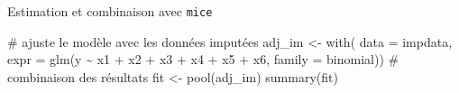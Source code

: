 \documentclass[
  ignorenonframetext,
]{beamer}
\newenvironment{Shaded}{\begin{snugshade}}{\end{snugshade}}
\newcommand{\AttributeTok}[1]{\textcolor[rgb]{0.40,0.45,0.13}{#1}}
\newcommand{\CommentTok}[1]{\textcolor[rgb]{0.37,0.37,0.37}{#1}}
\newcommand{\FunctionTok}[1]{\textcolor[rgb]{0.28,0.35,0.67}{#1}}
\newcommand{\NormalTok}[1]{\textcolor[rgb]{0.00,0.23,0.31}{#1}}
\newcommand{\OtherTok}[1]{\textcolor[rgb]{0.00,0.23,0.31}{#1}}
\newcommand{\SpecialCharTok}[1]{\textcolor[rgb]{0.37,0.37,0.37}{#1}}
\begin{document}
\begin{frame}[fragile]{Estimation et combinaison avec \texttt{mice}}
\label{estimation-et-combinaison-avec-mice}
\begin{Shaded}
\begin{Highlighting}[numbers=left,,]
\CommentTok{\# ajuste le modèle avec les données imputées}
\NormalTok{adj\_im }\OtherTok{\textless{}{-}} \FunctionTok{with}\NormalTok{(}
  \AttributeTok{data =}\NormalTok{ impdata,}
  \AttributeTok{expr =} \FunctionTok{glm}\NormalTok{(y }\SpecialCharTok{\textasciitilde{}}\NormalTok{ x1 }\SpecialCharTok{+}\NormalTok{ x2 }\SpecialCharTok{+}\NormalTok{ x3 }\SpecialCharTok{+}\NormalTok{ x4 }\SpecialCharTok{+}\NormalTok{ x5 }\SpecialCharTok{+}\NormalTok{ x6,}
             \AttributeTok{family =}\NormalTok{ binomial))}
\CommentTok{\# combinaison des résultats }
\NormalTok{fit }\OtherTok{\textless{}{-}} \FunctionTok{pool}\NormalTok{(adj\_im)}
\FunctionTok{summary}\NormalTok{(fit)}
\end{Highlighting}
\end{Shaded}
\end{frame}
\end{document}
